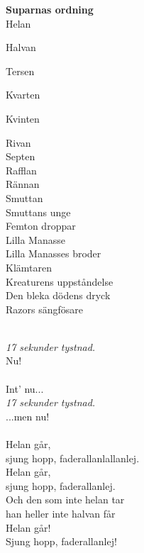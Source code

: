 
\begin{centering}
\Large \textbf{Suparnas ordning}  \\
\vspace{0.5cm}
\small
Helan

Halvan

Tersen

Kvarten

Kvinten

Rivan\\
Septen\\
Rafflan\\
Rännan\\
Smuttan\\
Smuttans unge\\
Femton droppar\\
Lilla Manasse\\
Lilla Manasses broder\\
Klämtaren\\
Kreaturens uppståndelse\\
Den bleka dödens dryck\\
Razors sängfösare\\
\end{centering}
\clearpage
\vspace{0.15cm}
\melo{} \\
\songtext{}\textit{17 sekunder tystnad.}\\
Nu! \\

\vspace{0.15cm}
\melo{} \\
\songtext{}Int' nu... \\ 
\textit{17 sekunder tystnad.}\\
 ...men nu! \\

\melochtext{} \\

\songtext{}Helan går,\\
sjung hopp, faderallanlallanlej.\\
Helan går,\\
sjung hopp, faderallanlej.\\
Och den som inte helan tar\\
han heller inte halvan får\\
Helan går!\\
Sjung hopp, faderallanlej! \\

